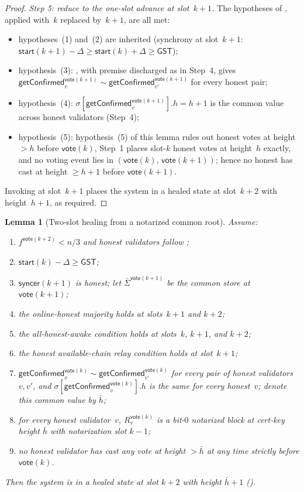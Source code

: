 \documentclass{article}
\newcommand{\syncer}{\mathsf{syncer}}
\newcommand{\start}{\mathsf{start}}
\newcommand{\vote}{\mathsf{vote}}
\newcommand{\comm}[1]{\bar{#1}}
\newcommand{\getConfirmed}{\textsf{getConfirmed}\xspace}
\theoremstyle{plain}
\newtheorem{lemma}{Lemma}
\theoremstyle{definition}
\theoremstyle{remark}
\newcommand{\GST}{\ensuremath{\mathsf{GST}}}
\newcommand{\OHM}{online-honest majority\xspace}
\newcommand{\HAR}{honest available-chain relay\xspace}
\newcommand{\AHA}{all-honest-awake\xspace}
\begin{document}
\begin{proof}
\emph{Step 5: reduce to the one-slot advance at slot~$k+1$.}
The hypotheses of , applied with~$k$ replaced by~$k+1$, are all met:
\begin{itemize}
  \item hypotheses~(1) and~(2) are inherited (synchrony at slot~$k+1$: $\start(k+1) - \Delta \geq \start(k) + \Delta \geq \GST$);
  \item hypothesis~(3): , with premise discharged as in Step~4, gives $\getConfirmed_v^{\vote(k+1)} \sim \getConfirmed_{v'}^{\vote(k+1)}$ for every honest pair;
  \item hypothesis~(4): $\sigma[\getConfirmed_v^{\vote(k+1)}].h = h + 1$ is the common value across honest validators (Step~4);
  \item hypothesis~(5): hypothesis~(5) of this lemma rules out honest votes at height $>h$ before $\vote(k)$, Step~1 places slot-$k$ honest votes at height~$h$ exactly, and no voting event lies in $(\vote(k),\, \vote(k+1))$; hence no honest has cast at height $\geq h+1$ before $\vote(k+1)$.
\end{itemize}
Invoking  at slot~$k+1$ places the system in a healed state at slot~$k+2$ with height~$h+1$, as required.
\end{proof}

\begin{lemma}[Two-slot healing from a notarized common root]\label{rev:lem:healing-from-notarized}
Assume:
\begin{enumerate}
  \item $f^{\vote(k+2)} < n/3$ and honest validators follow ;
  \item $\start(k) - \Delta \geq \GST$;
  \item $\syncer(k+1)$ is honest; let $\comm{\Sigma}^{\vote(k+1)}$ be the common store at $\vote(k+1)$;
  \item the \OHM holds at slots~$k+1$ and $k+2$;
  \item the \AHA condition holds at slots~$k$, $k+1$, and $k+2$;
  \item the \HAR condition holds at slot~$k+1$;
  \item $\getConfirmed_v^{\vote(k)} \sim \getConfirmed_{v'}^{\vote(k)}$ for every pair of honest validators~$v, v'$, and $\sigma[\getConfirmed_v^{\vote(k)}].h$ is the same for every honest~$v$; denote this common value by $\comm{h}$;
  \item for every honest validator~$v$, $R_v^{\vote(k)}$ is a bit-$0$ notarized block at cert-key height $\comm{h}$ with notarization slot $k-1$;
  \item no honest validator has cast any vote at height $> \comm{h}$ at any time strictly before $\vote(k)$.
\end{enumerate}
Then the system is in a healed state at slot $k+2$ with height $\comm{h}+1$ ().
\end{lemma}
\end{document}
